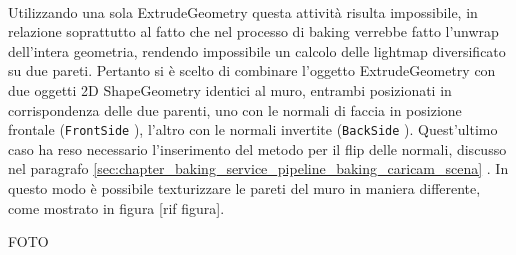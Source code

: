 \\
Utilizzando una sola ExtrudeGeometry questa attività risulta impossibile, in relazione soprattutto al fatto che nel processo di baking verrebbe fatto l’unwrap dell’intera geometria, rendendo impossibile un calcolo delle lightmap diversificato su due pareti.
Pertanto si è scelto di combinare l’oggetto ExtrudeGeometry con due oggetti 2D ShapeGeometry identici al muro, entrambi posizionati in corrispondenza delle due parenti, uno con le normali di faccia in posizione frontale (\texttt{FrontSide} ), l’altro con le normali invertite (\texttt{BackSide} ). Quest’ultimo caso ha reso necessario l’inserimento del metodo per il flip delle normali, discusso nel paragrafo \ref{sec:chapter_baking_service_pipeline_baking_caricam_scena} . In questo modo è possibile texturizzare le pareti del muro in maniera differente, come mostrato in figura [rif figura].

FOTO

